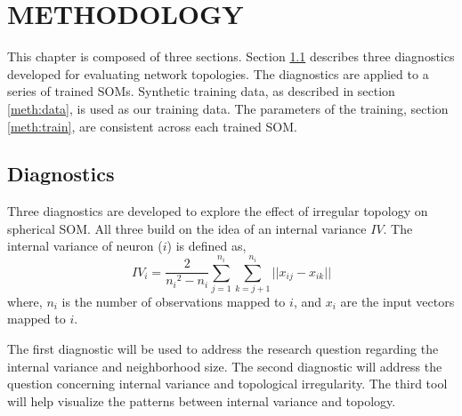 \chapter{METHODOLOGY}
This chapter is composed of three sections.  Section \ref{meth:diag} describes
three diagnostics developed for evaluating network topologies.  The
diagnostics are applied to a series of trained SOMs.  Synthetic training data,
as described in section \ref{meth:data}, is used as our training data.  The
parameters of the training, section \ref{meth:train}, are consistent across
each trained SOM.

\section{Diagnostics}
\label{meth:diag}
Three diagnostics are developed to explore the effect of irregular topology on
spherical SOM.  All three build on the idea of an internal variance \(IV\). The
internal variance of neuron (\(i\)) is defined as,
 \begin{equation}
   {IV_i} = \frac{2}{{n_i}^2-{n_i}}\sum_{j=1}^{n_i}\sum_{k=j+1}^{n_i} ||{x_{ij}}-{x_{ik}}||
 \label{eqno1}
 \end{equation}
where, \(n_i\) is the number of observations mapped to \(i\), and \(x_i\) are
the input vectors mapped to \(i\).

The first diagnostic will be used to address the research question regarding
the internal variance and neighborhood size.  The second diagnostic will
address the question concerning internal variance and topological
irregularity.  The third tool will help visualize the patterns between
internal variance and topology.

